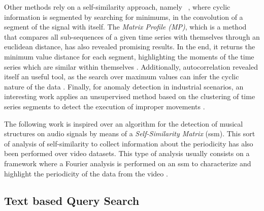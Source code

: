 \par
Other methods rely on a self-similarity approach, namely ~\cite{neuza}, where cyclic information is segmented by searching for minimums, in the convolution of a segment of the signal with itself. The \textit{Matrix Profile (MP)}, which is a method that compares all sub-sequences of a given time series with themselves through an euclidean distance, has also revealed promising results. In the end, it returns the minimum value distance for each segment, highlighting the moments of the time series which are similar within themselves \cite{Yeh2018}. Additionally, autocorrelation revealed itself an useful tool, as the search over maximum values can infer the cyclic nature of the data \cite{Bauters2014}. Finally, for anomaly detection in industrial scenarios, an interesting work applies an unsupervised method based on the clustering of time series segments to detect the execution of improper movements \cite{Varandas19}. 
\par
The following work is inspired over an algorithm for the detection of musical structures on audio signals \cite{foote2000, audiolabs1, audiolabs2} by means of a \textit{Self-Similarity Matrix } (\gls{ssm}). This sort of analysis of self-similarity to collect information about the periodicity has also been performed over video datasets. This type of analysis usually consists on a framework where a Fourier analysis is performed on an \gls{ssm} to characterize and highlight the periodicity of the data from the video \cite{Cutler2002,Cutler2000,Cutler1999}.

\subsection{Text based Query Search}

